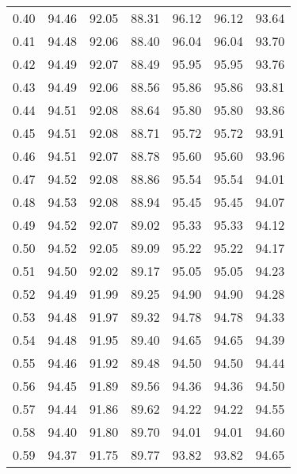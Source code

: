 \begin{tabular}{|c|c|c|c|c|c|c|}
      0.40 &     94.46 &     92.05 &      88.31 &   96.12 &      96.12 &         93.64 \\
      0.41 &     94.48 &     92.06 &      88.40 &   96.04 &      96.04 &         93.70 \\
      0.42 &     94.49 &     92.07 &      88.49 &   95.95 &      95.95 &         93.76 \\
      0.43 &     94.49 &     92.06 &      88.56 &   95.86 &      95.86 &         93.81 \\
      0.44 &     94.51 &     92.08 &      88.64 &   95.80 &      95.80 &         93.86 \\
      0.45 &     94.51 &     92.08 &      88.71 &   95.72 &      95.72 &         93.91 \\
      0.46 &     94.51 &     92.07 &      88.78 &   95.60 &      95.60 &         93.96 \\
      0.47 &     94.52 &     92.08 &      88.86 &   95.54 &      95.54 &         94.01 \\
      0.48 &     94.53 &     92.08 &      88.94 &   95.45 &      95.45 &         94.07 \\
      0.49 &     94.52 &     92.07 &      89.02 &   95.33 &      95.33 &         94.12 \\
      0.50 &     94.52 &     92.05 &      89.09 &   95.22 &      95.22 &         94.17 \\
      0.51 &     94.50 &     92.02 &      89.17 &   95.05 &      95.05 &         94.23 \\
      0.52 &     94.49 &     91.99 &      89.25 &   94.90 &      94.90 &         94.28 \\
      0.53 &     94.48 &     91.97 &      89.32 &   94.78 &      94.78 &         94.33 \\
      0.54 &     94.48 &     91.95 &      89.40 &   94.65 &      94.65 &         94.39 \\
      0.55 &     94.46 &     91.92 &      89.48 &   94.50 &      94.50 &         94.44 \\
      0.56 &     94.45 &     91.89 &      89.56 &   94.36 &      94.36 &         94.50 \\
      0.57 &     94.44 &     91.86 &      89.62 &   94.22 &      94.22 &         94.55 \\
      0.58 &     94.40 &     91.80 &      89.70 &   94.01 &      94.01 &         94.60 \\
      0.59 &     94.37 &     91.75 &      89.77 &   93.82 &      93.82 &         94.65 \\

\end{tabular}
